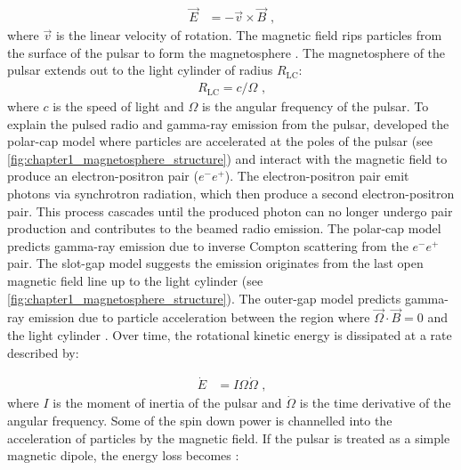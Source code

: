 \begin{equation}
    \begin{aligned}
    \vec{E} &= - \vec{v} \times \vec{B}\text{ ,}
    \end{aligned}
\end{equation}
where $\vec{v}$ is the linear velocity of rotation. The magnetic field rips particles from the surface of the pulsar to form the magnetosphere \citep{1968Natur.218..731G,1969ApJ...157..869G}. The magnetosphere of the pulsar extends out to the light cylinder of radius $R_\text{LC}$:
\begin{equation}
    \begin{aligned}
    R_\text{LC}=c/\Omega\text{ ,}
    \end{aligned}
\end{equation}
where $c$ is the speed of light and $\Omega$ is the angular frequency of the pulsar.
\newpar
To explain the pulsed radio and gamma-ray emission from the pulsar, \cite{1971ApJ...164..529S} developed the polar-cap model where particles are accelerated at the poles of the pulsar (see \autoref{fig:chapter1_magnetosphere_structure}) and interact with the magnetic field to produce an electron-positron pair ($e^-e^+$). The electron-positron pair emit photons via synchrotron radiation, which then produce a second electron-positron pair. This process cascades until the produced photon can no longer undergo pair production and contributes to the beamed radio emission. The polar-cap model predicts gamma-ray emission due to inverse Compton scattering from the $e^-e^+$ pair. The slot-gap model \citep{1983ApJ...266..215A} suggests the emission originates from the last open magnetic field line up to the light cylinder (see \autoref{fig:chapter1_magnetosphere_structure}). The outer-gap model predicts gamma-ray emission due to particle acceleration between the region where $\vec{\Omega}\cdot\vec{B}=0$ and the light cylinder \citep{1986ApJ...300..500C}.
\newpar
Over time, the rotational kinetic energy is dissipated at a rate described by:

\begin{equation}
    \begin{aligned}
        \dot{E}&=I\Omega\dot{\Omega}\text{ ,}
    \end{aligned}
\end{equation}
\noindent where $I$ is the moment of inertia of the pulsar and $\dot{\Omega}$ is the time derivative of the angular frequency. Some of the spin down power is channelled into the acceleration of particles by the magnetic field. If the pulsar is treated as a simple magnetic dipole, the energy loss becomes \citep{Slane2017}: 

